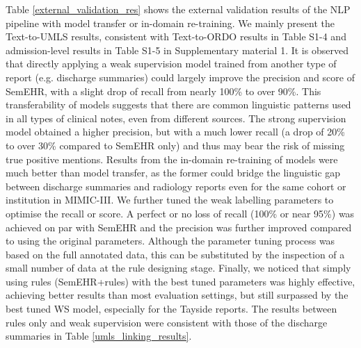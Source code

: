 \documentclass[twocolumn]{bmcart}
\begin{document}
Table \ref{external_validation_res} shows the external validation results of the NLP pipeline with model transfer or in-domain re-training. We mainly present the Text-to-UMLS results, consistent with Text-to-ORDO results in Table S1-4 and admission-level results in Table S1-5 in Supplementary material 1. It is observed that directly applying a weak supervision model trained from another type of report (e.g. discharge summaries) could largely improve the precision and  score of SemEHR, with a slight drop of recall from nearly 100\% to over 90\%. This transferability of models suggests that there are common linguistic patterns used in all types of clinical notes, even from different sources. The strong supervision model obtained a higher precision, but with a much lower recall (a drop of 20\% to over 30\% compared to SemEHR only) and thus may bear the risk of missing true positive mentions. Results from the in-domain re-training of models were much better than model transfer, as the former could bridge the linguistic gap between discharge summaries and radiology reports even for the same cohort or institution in MIMIC-III. We further tuned the weak labelling parameters to optimise the recall or  score. A perfect or no loss of recall (100\% or near 95\%) was achieved on par with SemEHR and the precision was further improved compared to using the original parameters. Although the parameter tuning process was based on the full annotated data, this can be substituted by the inspection of a small number of data at the rule designing stage. Finally, we noticed that simply using rules (SemEHR+rules) with the best tuned parameters was highly effective, achieving better results than most evaluation settings, but still surpassed by the best tuned WS model, especially for the Tayside reports. The results between rules only and weak supervision were consistent with those of the discharge summaries in Table \ref{umls_linking_results}.
\end{document}
